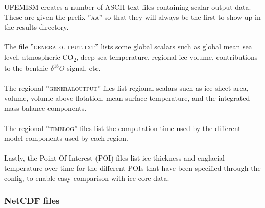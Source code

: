 \documentclass{article}
\begin{document}
UFEMISM creates a number of ASCII text files containing scalar output data. These are given the prefix ''\textsc{aa\textunderscore}'' so that they will always be the first to show up in the results directory.\\
\\
The file ''\textsc{general\textunderscore output.txt}'' lists some global scalars such as global mean sea level, atmospheric CO\textsubscript{2}, deep-sea temperature, regional ice volume, contributions to the benthic $\delta^{18}O$ signal, etc.\\
\\
The regional ''\textsc{general\textunderscore output}'' files list regional scalars such as ice-sheet area, volume, volume above flotation, mean surface temperature, and the integrated mass balance components.\\
\\
The regional ''\textsc{time\textunderscore log}'' files list the computation time used by the different model components used by each region.\\
\\
Lastly, the Point-Of-Interest (POI) files list ice thickness and englacial temperature over time for the different POIs that have been specified through the config, to enable easy comparison with ice core data.

\subsubsection{NetCDF files}
\end{document}
